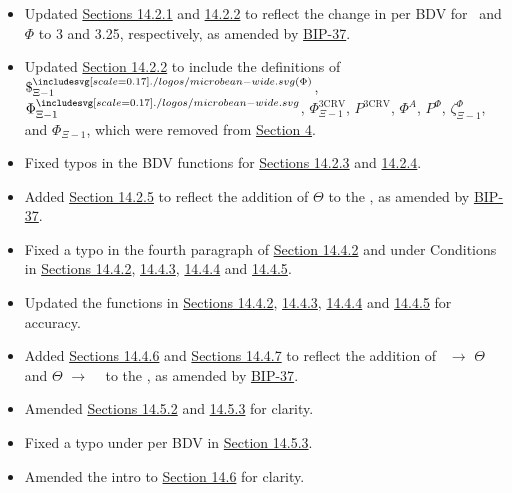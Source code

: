 \documentclass[class=article, crop=false]{standalone}
\begin{document}
\begin{itemize}[topsep=0pt, itemsep=3pt,leftmargin=16pt]
\begin{itemize}
        \item Updated \hyperlink{subsubsection.14.2.1}{Sections 14.2.1} and \hyperlink{subsubsection.14.2.2}{14.2.2} to reflect the change in  per BDV for \Bean\ and $\Phi$ to 3 and 3.25, respectively, as amended by \href{https://bean.money/bip-37}{BIP-37}.
        \item Updated \hyperlink{subsubsection.14.2.2}{Section 14.2.2} to include the definitions of \hyperlink{ht3}{$\$^{\bean(\Phi)}_{\Xi-1}$}, \hyperlink{ht193}{$\Phi_{\Xi-1}^{\bean}$}, \hyperlink{ht194}{$\Phi_{\Xi-1}^{\text{3CRV}}$}, \hyperlink{ht136}{$P^{\text{3CRV}}$}, \hyperlink{ht190}{$\Phi^{A}$}, \hyperlink{ht140}{$P^{\Phi}$}, \hyperlink{ht96}{$\zeta^{\Phi}_{\Xi-1}$}, and \hyperlink{ht192}{$\Phi_{\Xi-1}$}, which were removed from \hyperlink{section.4}{Section 4}.
        \item Fixed typos in the BDV functions for \hyperlink{subsubsection.14.2.3}{Sections 14.2.3} and \hyperlink{subsubsection.14.2.3}{14.2.4}.
        \item Added \hyperlink{subsubsection.14.2.5}{Section 14.2.5} to reflect the addition of $\Theta$ to the , as amended by \href{https://bean.money/bip-37}{BIP-37}.
        \item Fixed a typo in the fourth paragraph of \hyperlink{subsubsection.14.4.2}{Section 14.4.2} and under Conditions in \hyperlink{subsubsection.14.4.2}{Sections 14.4.2}, \hyperlink{subsubsection.14.4.3}{14.4.3}, \hyperlink{subsubsection.14.4.4}{14.4.4} and \hyperlink{subsubsection.14.4.5}{14.4.5}.
        \item Updated the  functions in \hyperlink{subsubsection.14.4.2}{Sections 14.4.2}, \hyperlink{subsubsection.14.4.3}{14.4.3}, \hyperlink{subsubsection.14.4.4}{14.4.4} and \hyperlink{subsubsection.14.4.5}{14.4.5} for accuracy.
        \item Added \hyperlink{subsubsection.14.4.6}{Sections 14.4.6} and \hyperlink{subsubsection.14.4.7}{Sections 14.4.7} to reflect the addition of \Bean\ $\rightarrow$ $\Theta$ and $\Theta$ $\rightarrow$ \Bean\  to the , as amended by \href{https://bean.money/bip-37}{BIP-37}.
        \item Amended \hyperlink{subsubsection.14.5.2}{Sections 14.5.2} and \hyperlink{subsubsection.14.5.3}{14.5.3} for clarity.
        \item Fixed a typo under  per BDV in \hyperlink{subsubsection.14.5.3}{Section 14.5.3}. 
        \item Amended the intro to \hyperlink{subsection.14.6}{Section 14.6} for clarity.

\end{itemize}
\end{itemize}
\end{document}
